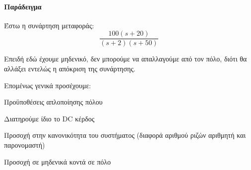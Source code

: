 \documentclass[11pt,a4paper,notitlepage,fleqn,final]{article}
\begin{document}
\paragraph{Παράδειγμα}
Έστω η συνάρτηση μεταφοράς:
\[
\frac{100(s+20)}{(s+2)(s+50)}
\]

Επειδή εδώ έχουμε μηδενικό, δεν μπορούμε να απαλλαγούμε από τον πόλο, διότι θα αλλάξει
εντελώς η απόκριση της συνάρτησης.

Επομένως γενικά προσέχουμε:
\begin{infobox}{Προϋποθέσεις απλοποίησης πόλου}
\begin{enumpar}
	\item Διατηρούμε ίδιο το DC κέρδος
	\item Προσοχή στην κανονικότητα του συστήματος  (διαφορά αριθμού ριζών αριθμητή και παρονομαστή)
	\item Προσοχή σε μηδενικά κοντά σε πόλο
\end{enumpar}
\end{infobox}
\end{document}
